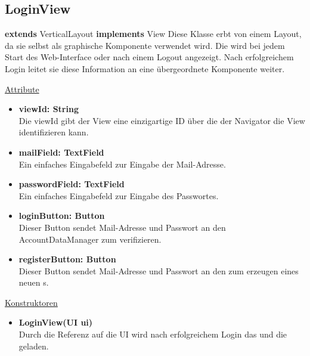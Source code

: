 \newpage
\subsection{LoginView}\label{LoginView}
\textbf{extends}  VerticalLayout \newline
\textbf{implements} View \newline
Diese Klasse erbt von einem Layout, da sie selbst als graphische Komponente verwendet wird. Die  wird bei jedem Start des Web-Interface oder nach einem Logout angezeigt. Nach erfolgreichem Login leitet sie diese Information an eine übergeordnete Komponente weiter.
\newline

\underline{Attribute}
\begin{itemize}
\itemsep0pt
\item \textbf{viewId: String} \hfill\\ 
Die viewId gibt der View eine einzigartige ID über die der Navigator die View identifizieren kann.

\item \textbf{mailField: TextField} \hfill\\ 
Ein einfaches Eingabefeld zur Eingabe der Mail-Adresse.

\item \textbf{passwordField: TextField} \hfill\\
Ein einfaches Eingabefeld zur Eingabe des Passwortes.

\item \textbf{loginButton: Button} \hfill\\
Dieser Button sendet Mail-Adresse und Passwort an den AccountDataManager zum verifizieren.

\item \textbf{registerButton: Button} \hfill\\
Dieser Button sendet Mail-Adresse und Passwort an den  zum erzeugen eines neuen s.

\end{itemize}

\underline{Konstruktoren}
\begin{itemize}
\itemsep0pt
\item \textbf{LoginView(UI ui)} \hfill\\
Durch die Referenz auf die UI wird nach erfolgreichem Login das  und die  geladen.
\end{itemize}

